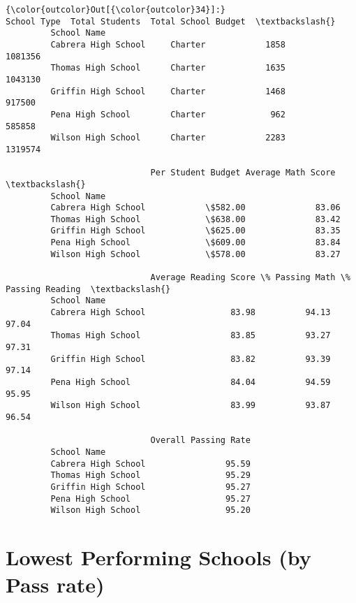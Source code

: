 \documentclass[11pt]{article}
\begin{document}
\begin{Verbatim}[commandchars=\\\{\}]
{\color{outcolor}Out[{\color{outcolor}34}]:}                     School Type  Total Students  Total School Budget  \textbackslash{}
         School Name                                                            
         Cabrera High School     Charter            1858              1081356   
         Thomas High School      Charter            1635              1043130   
         Griffin High School     Charter            1468               917500   
         Pena High School        Charter             962               585858   
         Wilson High School      Charter            2283              1319574   
         
                             Per Student Budget Average Math Score  \textbackslash{}
         School Name                                                 
         Cabrera High School            \$582.00              83.06   
         Thomas High School             \$638.00              83.42   
         Griffin High School            \$625.00              83.35   
         Pena High School               \$609.00              83.84   
         Wilson High School             \$578.00              83.27   
         
                             Average Reading Score \% Passing Math \% Passing Reading  \textbackslash{}
         School Name                                                                  
         Cabrera High School                 83.98          94.13             97.04   
         Thomas High School                  83.85          93.27             97.31   
         Griffin High School                 83.82          93.39             97.14   
         Pena High School                    84.04          94.59             95.95   
         Wilson High School                  83.99          93.87             96.54   
         
                             Overall Passing Rate  
         School Name                               
         Cabrera High School                95.59  
         Thomas High School                 95.29  
         Griffin High School                95.27  
         Pena High School                   95.27  
         Wilson High School                 95.20  
\end{Verbatim}
            
    \section{Lowest Performing Schools (by Pass
rate)}\label{lowest-performing-schools-by-pass-rate}
\end{document}

